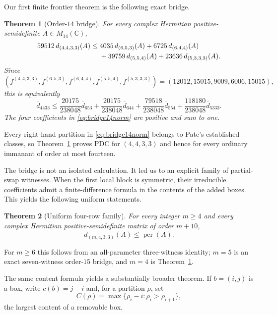 \documentclass[11pt]{article}
\newtheorem{theorem}{Theorem}[section]
\theoremstyle{definition}
\newcommand{\per}{\operatorname{per}}
\newcommand{\C}{\mathbb C}
\newcommand{\dbar}{\overline d}
\begin{document}
Our first finite frontier theorem is the following exact bridge.

\begin{theorem}[Order-$14$ bridge]\label{thm:bridge14}
For every complex Hermitian positive-semidefinite $A\in M_{14}(\C)$,
\begin{align}
59512\,d_{(4,4,3,3)}(A)\le{}&4035\,d_{(6,5,3)}(A)+6725\,d_{(6,4,4)}(A)\notag\\
&+39759\,d_{(5,5,4)}(A)+23636\,d_{(5,3,3,3)}(A).\label{eq:bridge14}
\end{align}
Since
\[
(f^{(4,4,3,3)},f^{(6,5,3)},f^{(6,4,4)},f^{(5,5,4)},f^{(5,3,3,3)})
=(12012,15015,9009,6006,15015),
\]
this is equivalently
\begin{equation}\label{eq:bridge14norm}
\dbar_{4433}\le
\frac{20175}{238048}\dbar_{653}+
\frac{20175}{238048}\dbar_{644}+
\frac{79518}{238048}\dbar_{554}+
\frac{118180}{238048}\dbar_{5333}.
\end{equation}
The four coefficients in \eqref{eq:bridge14norm} are positive and sum to one.
\end{theorem}

Every right-hand partition in \eqref{eq:bridge14norm} belongs to Pate's established classes, so Theorem~\ref{thm:bridge14} proves PDC for $(4,4,3,3)$ and hence for every ordinary immanant of order at most fourteen.

The bridge is not an isolated calculation.  It led us to an explicit family of partial-swap witnesses.  When the first local block is symmetric, their irreducible coefficients admit a finite-difference formula in the contents of the added boxes.  This yields the following uniform statements.

\begin{theorem}[Uniform four-row family]\label{thm:m433}
For every integer $m\ge4$ and every complex Hermitian positive-semidefinite matrix of order $m+10$,
\[
 \dbar_{(m,4,3,3)}(A)\le \per(A).
\]
\end{theorem}

For $m\ge6$ this follows from an all-parameter three-witness identity; $m=5$ is an exact seven-witness order-$15$ bridge, and $m=4$ is Theorem~\ref{thm:bridge14}.

The same content formula yields a substantially broader theorem.  If $b=(i,j)$ is a box, write $c(b)=j-i$ and, for a partition $\rho$, set
\[
 C(\rho)=\max\{\rho_i-i:\rho_i>\rho_{i+1}\},
\]
the largest content of a removable box.
\end{document}
